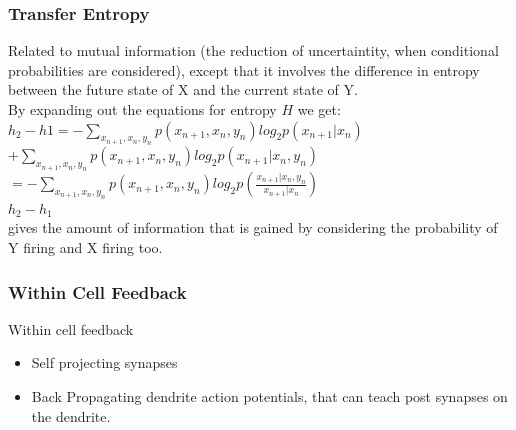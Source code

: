 \documentclass{beamer}
\begin{document}
\begin{frame}
\frametitle{Transfer Entropy}
Related to mutual information (the reduction of uncertaintity, when conditional probabilities are considered), except that it involves the difference in entropy between the future state of X and the current state of Y.\\ 

By expanding out the equations for entropy $ H $ we get:\\
\vfill \center $h_{2}-h{1}=-\sum_{x_{n+1},x_{n},y_{n}}p(x_{n+1},x_{n},y_{n})log_{2}p(x_{n+1}|x_{n})$ \\
\center $+ \sum_{x_{n+1},x_{n},y_{n}}p(x_{n+1},x_{n},y_{n})log_{2}p(x_{n+1}|x_{n},y_{n})$\\

\vfill
\center 	$=-\sum_{x_{n+1},x_{n},y_{n}}p(x_{n+1},x_{n},y_{n})log_{2}p(\frac{x_{n+1}|x_{n},y_{n}}{x_{n+1}|x_{n}})$\\
$h_{2}-h_{1}$ \\gives the amount of information that is gained by considering the probability of Y firing and X firing too.
\end{frame}



\begin{frame}
\frametitle{Within Cell Feedback}
Within cell feedback
\begin{itemize}
\vfill \item Self projecting synapses
\vfill \item Back Propagating dendrite action potentials, that can teach post synapses on the dendrite.
\end{itemize}
\end{frame}
\end{document}
